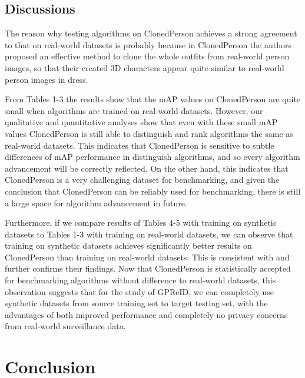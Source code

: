 \documentclass[10pt,twocolumn,letterpaper]{article}
\begin{document}
\subsection{Discussions}






The reason why testing algorithms on ClonedPerson achieves a strong agreement to that on real-world datasets is probably because in ClonedPerson \cite{Wang-2022-Clonedperson} the authors proposed an effective method to clone the whole outfits from real-world person images, so that their created 3D characters appear quite similar to real-world person images in dress.

From Tables 1-3 the results show that the mAP values on ClonedPerson are quite small when algorithms are trained on real-world datasets. However, our qualitative and quantitative analyses show that even with these small mAP values ClonedPerson is still able to distinguish and rank algorithms the same as real-world datasets. This indicates that ClonedPerson is sensitive to subtle differences of mAP performance in distinguish algorithms, and so 
every algorithm advancement will be correctly reflected. On the other hand, this indicates that ClonedPerson is a very challenging dataset for benchmarking, and given the conclusion that ClonedPerson can be reliably used for benchmarking, there is still a large space for algorithm advancement in future.

Furthermore, if we compare results of Tables 4-5 with training on synthetic datasets to Tables 1-3 with training on real-world datasets, we can observe that training on synthetic datasets achieves significantly better results on ClonedPerson than training on real-world datasets. This is consistent with \cite{wang20rand,zhang2021unrealperson,Wang-2022-Clonedperson} and further confirms their findings. Now that ClonedPerson is statistically accepted for benchmarking algorithms without difference to real-world datasets, this observation suggests that for the study of GPReID, we can completely use synthetic datasets from source training set to target testing set, with the advantages of both improved performance and completely no privacy concerns from real-world surveillance data.





\section{Conclusion}
\end{document}
